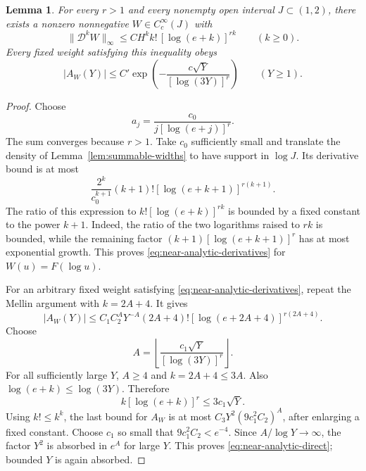 \documentclass[11pt]{article}
\newtheorem{lemma}[theorem]{Lemma}
\begin{document}
\begin{lemma}\label{lem:near-analytic-bumps}
For every $r>1$ and every nonempty open interval $J\subset(1,2)$,
there exists a nonzero nonnegative $W\in C_c^\infty(J)$ with
\begin{equation}\label{eq:near-analytic-derivatives}
 \|\mathcal D^kW\|_\infty
 \le C H^k k!\,[\log(e+k)]^{rk}\qquad(k\ge0).
\end{equation}
Every fixed weight satisfying this inequality obeys
\begin{equation}\label{eq:near-analytic-direct}
 |A_W(Y)|\le C'\exp\left(-\frac{c\sqrt Y}{[\log(3Y)]^r}\right)
 \qquad(Y\ge1).
\end{equation}
\end{lemma}
\begin{proof}
Choose
\[
 a_j=\frac{c_0}{j[\log(e+j)]^r}.
\]
The sum converges because $r>1$. Take $c_0$ sufficiently small and
translate the density of Lemma~\ref{lem:summable-widths} to have
support in $\log J$. Its derivative bound is at most
\[
 \frac{2^k}{c_0^{k+1}}(k+1)!
       [\log(e+k+1)]^{r(k+1)}.
\]
The ratio of this expression to $k![\log(e+k)]^{rk}$ is bounded
by a fixed constant to the power $k+1$. Indeed, the ratio of the
two logarithms raised to $rk$ is bounded, while the remaining
factor $(k+1)[\log(e+k+1)]^r$ has at most exponential growth.
This proves \eqref{eq:near-analytic-derivatives} for $W(u)=F(\log u)$.

For an arbitrary fixed weight satisfying
\eqref{eq:near-analytic-derivatives}, repeat the Mellin argument
with $k=2A+4$. It gives
\[
 |A_W(Y)|\le C_1 C_2^A Y^{-A}
       (2A+4)![\log(e+2A+4)]^{r(2A+4)}.
\]
Choose
\[
 A=\left\lfloor\frac{c_1\sqrt Y}{[\log(3Y)]^r}\right\rfloor.
\]
For all sufficiently large $Y$, $A\ge4$ and $k=2A+4\le3A$.
Also $\log(e+k)\le\log(3Y)$. Therefore
\[
 k[\log(e+k)]^r\le3c_1\sqrt Y.
\]
Using $k!\le k^k$, the last bound for $A_W$ is at most
$C_3Y^2(9c_1^2C_2)^A$, after enlarging a fixed constant.
Choose $c_1$ so small that $9c_1^2C_2<e^{-4}$.
Since $A/\log Y\to\infty$, the factor $Y^2$ is absorbed in
$e^A$ for large $Y$. This proves
\eqref{eq:near-analytic-direct}; bounded $Y$ is again absorbed.
\end{proof}
\end{document}

